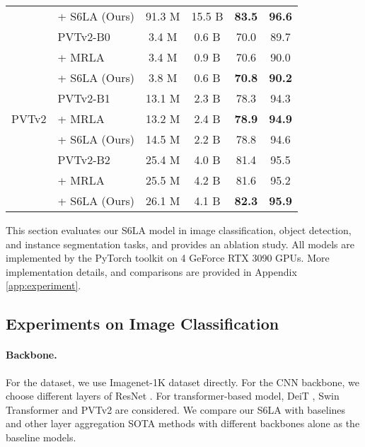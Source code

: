 \begin{table}[h]
\begin{center}
{\begin{tabular}{c|l|cc|cc}
    & + S6LA (Ours) & 91.3 M & 15.5 B & \textbf{83.5} & \textbf{96.6} \\
    \cmidrule(lr){2-6}
    \cmidrule(lr){1-6}
    \multirow{9}{*}{PVTv2} 
    & PVTv2-B0 \citep{wang2022pvt} & 3.4 M & 0.6 B & 70.0 & 89.7 \\
    & + MRLA \citep{fang2023cross} & 3.4 M & 0.9 B & 70.6 & 90.0 \\
    & + S6LA (Ours) & 3.8 M & 0.6 B & \textbf{70.8} & \textbf{90.2} \\
    \cmidrule(lr){2-6}
    & PVTv2-B1 \citep{wang2022pvt} & 13.1 M & 2.3 B & 78.3 & 94.3 \\
    & + MRLA \citep{fang2023cross} & 13.2 M & 2.4 B & \textbf{78.9} & \textbf{94.9} \\
    & + S6LA (Ours) & 14.5 M & 2.2 B & 78.8 & 94.6 \\
    \cmidrule(lr){2-6}
    & PVTv2-B2 \citep{wang2022pvt} & 25.4 M & 4.0 B & 81.4 & 95.5 \\
    & + MRLA \citep{fang2023cross} & 25.5 M & 4.2 B & 81.6 & 95.2 \\
    & + S6LA (Ours) & 26.1 M & 4.1 B & \textbf{82.3} & \textbf{95.9} \\
    \bottomrule
\end{tabular}
}
\end{center}
\vspace{-0.8cm}
\end{table}


This section evaluates our S6LA model in image classification, object detection, and instance segmentation tasks, and provides an ablation study. All models are implemented by the PyTorch toolkit on 4 GeForce RTX 3090 GPUs. More implementation details, and comparisons are provided in Appendix \ref{app:experiment}.

\subsection{Experiments on Image Classification}
\label{imagenet_classification}

\paragraph{Backbone.}
For the dataset, we use Imagenet-1K dataset \citep{5206848} directly. For the CNN backbone, we choose different layers of ResNet \citep{he2016deep}. For transformer-based model, DeiT \citep{touvron2021training}, Swin Transformer \citep{liu2021swin} and PVTv2 \citep{wang2022pvt} are considered. We compare our S6LA with baselines and other layer aggregation SOTA methods with different backbones alone as the baseline models.

